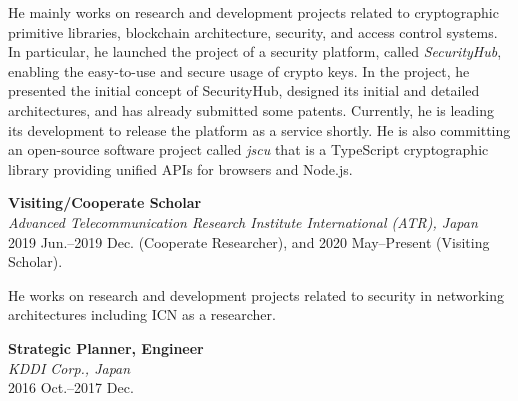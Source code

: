 \hspace*{4ex} He mainly works on research and development projects related to cryptographic primitive libraries, blockchain architecture, security, and access control systems. In particular, he launched the project of a security platform, called \emph{SecurityHub}, enabling the easy-to-use and secure usage of crypto keys. In the project, he presented the initial concept of SecurityHub, designed its initial and detailed architectures, and has already submitted some patents. Currently, he is leading its development to release the platform as a service shortly.
He is also committing an open-source software project called \emph{jscu} that is a TypeScript cryptographic library providing unified APIs for browsers and Node.js.
\vspace*{2ex}

\textbf{Visiting/Cooperate Scholar}\\
\hspace*{4ex}\textit{Advanced Telecommunication Research Institute International (ATR), Japan}\\
\hspace*{4ex}2019 Jun.--2019 Dec. (Cooperate Researcher), and 2020 May--Present (Visiting Scholar).

\hspace*{4ex} He works on research and development projects related to security in networking architectures including ICN as a researcher.
\vspace*{2ex}



\textbf{Strategic Planner, Engineer}\\
\hspace*{4ex}\textit{KDDI Corp., Japan}\\
\hspace*{4ex}2016 Oct.--2017 Dec.

